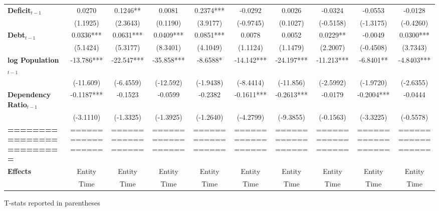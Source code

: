 \begin{center}
\begin{tabular}{lccccccccc}
\textbf{Deficit$_{t-1}$}             &       0.0270       &      0.1246**      &       0.0081       &     0.2374***      &      -0.0292       &       0.0026       &      -0.0324       &      -0.0553       &      -0.0128        \\
\textbf{ }                         &      (1.1925)      &      (2.3643)      &      (0.1190)      &      (3.9177)      &     (-0.9745)      &      (0.1027)      &     (-0.5158)      &     (-1.3175)      &     (-0.4260)       \\
\textbf{Debt$_{t-1}$}                &     0.0336***      &     0.0631***      &     0.0409***      &     0.0851***      &       0.0078       &       0.0052       &      0.0229**      &      -0.0049       &     0.0300***       \\
\textbf{ }                         &      (5.1424)      &      (5.3177)      &      (8.3401)      &      (4.1049)      &      (1.1124)      &      (1.1479)      &      (2.2007)      &     (-0.4508)      &      (3.7343)       \\
\textbf{log Population$_{t-1}$}      &     -13.786***     &     -22.547***     &     -35.858***     &      -8.6588*      &     -14.142***     &     -24.197***     &     -11.213***     &     -6.8401**      &     -4.8403***      \\
\textbf{ }                         &     (-11.609)      &     (-6.4559)      &     (-12.592)      &     (-1.9438)      &     (-8.4414)      &     (-11.856)      &     (-2.5992)      &     (-1.9720)      &     (-2.6355)       \\
\textbf{Dependency Ratio$_{t-1}$}   &     -0.1187***     &      -0.1523       &      -0.0599       &      -0.2382       &     -0.1611***     &     -0.2613***     &      -0.0179       &     -0.2004***     &      -0.0444        \\
\textbf{ }                         &     (-3.1110)      &     (-1.3325)      &     (-1.3925)      &     (-1.2640)      &     (-4.2799)      &     (-9.3855)      &     (-0.1563)      &     (-3.3225)      &     (-0.5578)       \\
\textbf{=========================} & ================== & ================== & ================== & ================== & ================== & ================== & ================== & ================== & ==================  \\
\textbf{Effects}                   &       Entity       &       Entity       &       Entity       &       Entity       &       Entity       &       Entity       &       Entity       &       Entity       &       Entity        \\
\textbf{}                          &        Time        &        Time        &        Time        &        Time        &        Time        &        Time        &        Time        &        Time        &        Time         \\
\bottomrule
\end{tabular}
\end{center}

T-stats reported in parentheses